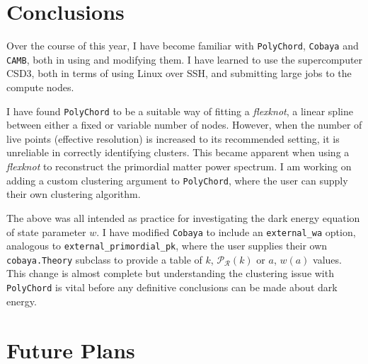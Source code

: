 \documentclass{article}
\begin{document}
\section{Conclusions}

Over the course of this year, I have become familiar with \texttt{PolyChord}, \texttt{Cobaya} and \texttt{CAMB}, both in using and modifying them. I have learned to use the supercomputer CSD3, both in terms of using Linux over SSH, and submitting large jobs to the compute nodes. 

I have found \texttt{PolyChord} to be a suitable way of fitting a \textit{flexknot}, a linear spline between either a fixed or variable number of nodes. However, when the number of live points (effective resolution) is increased to its recommended setting, it is unreliable in correctly identifying clusters. This became apparent when using a \textit{flexknot} to reconstruct the primordial matter power spectrum. I am working on adding a custom clustering argument to \texttt{PolyChord}, where the user can supply their own clustering algorithm.

The above was all intended as practice for investigating the dark energy equation of state parameter $w$. I have modified \texttt{Cobaya} to include an \texttt{external\_wa} option, analogous to \texttt{external\_primordial\_pk}, where the user supplies their own \texttt{cobaya.Theory} subclass to provide a table of $k$, $\mathcal P_\mathcal R(k)$ or $a$, $w(a)$ values. This change is almost complete but understanding the clustering issue with \texttt{PolyChord} is vital before any definitive conclusions can be made about dark energy.

\section{Future Plans}
\end{document}
